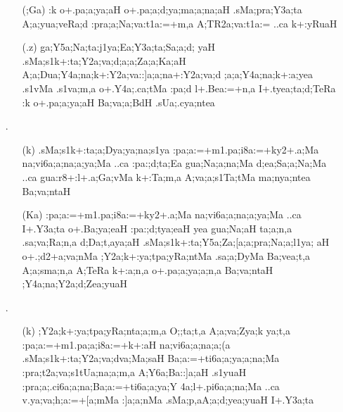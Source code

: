 \begin{itemize}
\begin{itemize}
                \item[({\sktf ;Ga})] {\sktf :k o+.pa;a;ya;aH
o+.pa;a;d;ya;ma;a;na;aH .sMa;pra;Y3a;ta
A;a;yua;veRa;d :pra;a;Na;va:t1a:=+m,a A;TR2a;va:t1a:= ..ca k+:yRuaH}
                
                \item[({\sktf .z})] {\sktf ga;Y5a;Na;ta:j1ya;Ea;Y3a;ta;Sa;a;d;%
yaH .sMa;s1k+:ta;Y2a;va;d;a;a;Za;a;Ka;aH%
 A;a;Dua;Y4a;na;k+:Y2a;va::]a;a;na\ZF{-}+:Y2a;va;d%
;a;a;Y4a;na;k+:a;yea .s1vMa .s1va;m,a o+.Y4a;.ca;tMa :pa;d l+.Bea:=+n,a\ZF{,}
I+.tyea;ta;d;TeRa :k o+.pa;a;ya;aH
Ba;va;a;BdH .sUa;.cya;ntea}
               \end{itemize} 
               
  \item[{\sktf 20}.] \begin{itemize}
             
             \item[({\sktf k})] {\sktf .sMa;s1k+:ta;a;Dya;ya;na;s1ya :pa;a:=+m1.pa;i8a:=+ky2+.a;Ma
na;vi6a;a;na;a;ya;Ma ..ca :pa:;d;ta;Ea gua;Na;a;na;Ma
d;ea;Sa;a;Na;Ma ..ca gua:r8+:l+.a;Ga;vMa k+:Ta;m,a A;va;a;s1Ta;tMa
ma;nya;ntea Ba;va;ntaH}
             
             \item[({\sktf Ka})] {\sktf :pa;a:=+m1.pa;i8a:=+ky2+.a;Ma
na;vi6a;a;na;a;ya;Ma ..ca I+.Y3a;ta o+.Ba;ya;eaH
:pa:;d;tya;eaH yea gua;Na;aH\ZF{,} ta;a;n,a
.sa;va;Ra;n,a d;Da;t,aya;aH} {\sktf .sMa;s1k+:ta;Y5a;Za;[a;a;pra;Na;a;l1ya;%
aH o+.;d2+a;va;nMa ;Y2a;k+:ya;tpa;yRa;ntMa .sa;a;DyMa
Ba;vea;t,a A;a;sma;n,a A;TeRa k+:a;n,a
o+.pa;a;ya;a;n,a Ba;va;ntaH ;Y4a;na;Y2a;d;Zea;yuaH}
             \end{itemize} 
             
             
 \item[{\sktf 21}.]  \begin{itemize}
                
                \item[({\sktf k})] {\sktf ;Y2a;k+:ya;tpa;yRa;nta;a;m,a
O;;ta;t,a A;a;va;Zya;k ya;t,a :pa;a:=+m1.pa;a;i8a:=+k+:aH%
 na;vi6a;a;na;a;(a} {\sktf .sMa;s1k+:ta;Y2a;va;dva;Ma;saH Ba;a:=+ti6a;a;ya;a;na;Ma :pra;t2a;va;s1tUa;na;a;m,a
A;Y6a;Ba::]a;aH .s1yuaH\ZF{,} :pra;a;.ci6a;a;na;Ba;a:=+ti6a;a;ya;Y%
4a;l+.pi6a;a;na;Ma ..ca v.ya;va;h;a:=+[a;mMa :]a;a;nMa .sMa;p,aA;a;d;yea;yuaH I+.Y3a;ta}
                

\end{itemize}
\end{itemize}

